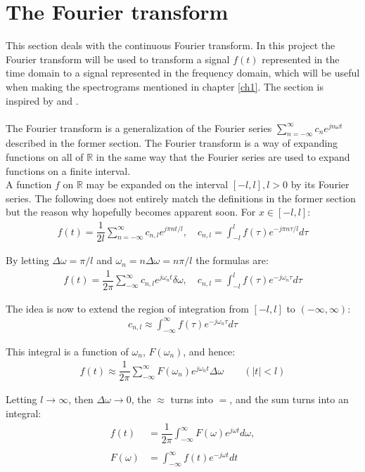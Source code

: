 \section{The Fourier transform}
This section deals with the continuous Fourier transform. In this project the Fourier transform will be used to transform a signal $f(t)$ represented in the time domain to a signal represented in the frequency domain, which will be useful when making the spectrograms mentioned in chapter \ref{ch1}. The section is inspired by \cite{FourierTrans} and \cite{FAA}.
\\ \\
The Fourier transform is a generalization of the Fourier series $\sum_{n=-\infty}^\infty c_n e^{jn\omega t}$ described in the former section. The Fourier transform is a way of expanding functions on all of $\mathbb{R}$ in the same way that the Fourier series are used to expand functions on a finite interval.
\\
A function $f$ on $\mathbb{R}$ may be expanded on the interval $[-l,l], l > 0$ by its Fourier series. The following does not entirely match the definitions in the former section but the reason why hopefully becomes apparent soon. For $x \in [-l,l]$:
\begin{align*}
f(t) = \dfrac{1}{2l} \sum_{n=-\infty}^\infty c_{n,l} e^{j \pi n t / l}, \quad c_{n,l} = \int_{-l}^l f(\tau) e^{-j\pi n \tau / l} d\tau
\end{align*}

By letting $\Delta \omega = \pi/l$ and $\omega_n = n\Delta\omega = n\pi/l$ the formulas are:
\begin{align*}
f(t) = \dfrac{1}{2\pi} \sum_{-\infty}^\infty c_{n,l} e^{j\omega_nt}\delta\omega, \quad c_{n,l} = \int_{-l}^l f(\tau) e^{-j\omega_n \tau} d\tau
\end{align*}

The idea is now to extend the region of integration from $[-l,l]$ to $(-\infty,\infty)$:
\begin{align*}
c_{n,l} \approx \int_{-\infty}^\infty f(\tau)e^{-j\omega_n\tau}d\tau
\end{align*}

This integral is a function of $\omega_n$, $F(\omega_n)$, and hence:
\begin{align*}
f(t) \approx \dfrac{1}{2\pi} \sum_{-\infty}^\infty F(\omega_n) e^{j\omega_nt} \Delta\omega \quad \quad (|t| < l)
\end{align*}

Letting $l \to \infty$, then $\Delta\omega \to 0$, the $\approx$ turns into $=$, and the sum turns into an integral:
\begin{align}
f(t) &= \dfrac{1}{2\pi} \int_{-\infty}^\infty F(\omega) e^{j\omega t} d\omega, \label{Fourier_inv} \\ \nonumber \\
F(\omega) &= \int_{-\infty}^\infty f(t) e^{-j\omega t} dt \label{Fourier_trans}
\end{align}

